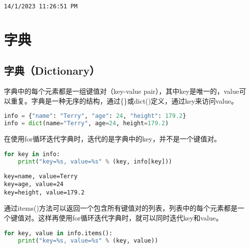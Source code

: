 \begin{tcolorbox}
	\begin{verbatim}
14/1/2023 11:26:51 PM
\end{verbatim}
\end{tcolorbox}

\newpage

\section{字典}

\subsection{字典（Dictionary）}

字典中的每个元素都是一组键值对（key-value pair），其中key是唯一的，value可以重复。字典是一种无序的结构，通过\{\}或dict()定义，通过key来访问value。

\vspace{-0.5cm}

\begin{lstlisting}[language=Python]
info = {"name": "Terry", "age": 24, "height": 179.2}
info = dict(name="Terry", age=24, height=179.2)
\end{lstlisting}

在使用for循环迭代字典时，迭代的是字典中的key，并不是一个键值对。

\vspace{-0.5cm}

\begin{lstlisting}[language=Python]
for key in info:
	print("key=%s, value=%s" % (key, info[key]))
\end{lstlisting}

\begin{tcolorbox}
	\begin{verbatim}
key=name, value=Terry
key=age, value=24
key=height, value=179.2
\end{verbatim}
\end{tcolorbox}

通过items()方法可以返回一个包含所有键值对的列表，列表中的每个元素都是一个键值对。这样再使用for循环迭代字典时，就可以同时迭代key和value。

\vspace{-0.5cm}

\begin{lstlisting}[language=Python]
for key, value in info.items():
	print("key=%s, value=%s" % (key, value))
\end{lstlisting}

